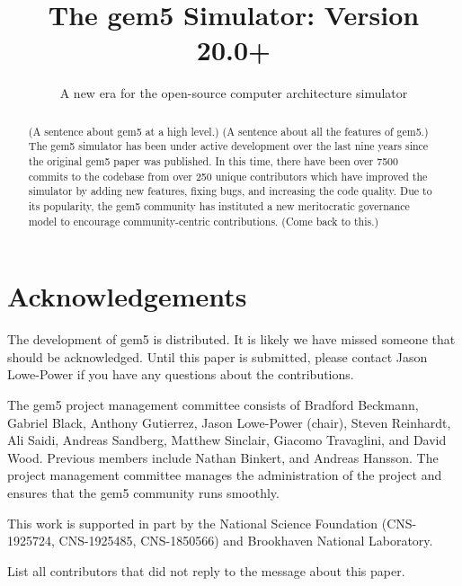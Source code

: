 \documentclass[manuscript, review, screen, timestamp]{acmart}
\begin{document}
\title{The gem5 Simulator: Version 20.0+}
\subtitle{A new era for the open-source computer architecture simulator}
%


\begin{abstract}
    (A sentence about gem5 at a high level.)
    (A sentence about all the features of gem5.)
    The gem5 simulator has been under active development over the last nine years since the original gem5 paper was published.
    In this time, there have been over 7500 commits to the codebase from over 250 unique contributors which have improved the simulator by adding new features, fixing bugs, and increasing the code quality.
    Due to its popularity, the gem5 community has instituted a new meritocratic governance model to encourage community-centric contributions.
    (Come back to this.)
\end{abstract}

\maketitle
\renewcommand{\shortauthors}{Lowe-Power and the gem5 Community}





\section{Acknowledgements}

The development of gem5 is distributed.
It is likely we have missed someone that should be acknowledged.
Until this paper is submitted, please contact Jason Lowe-Power if you have any questions about the contributions.

The gem5 project management committee consists of Bradford Beckmann, Gabriel Black, Anthony Gutierrez, Jason Lowe-Power (chair), Steven Reinhardt, Ali Saidi, Andreas Sandberg, Matthew Sinclair, Giacomo Travaglini, and David Wood.
Previous members include Nathan Binkert, and Andreas Hansson.
The project management committee manages the administration of the project and ensures that the gem5 community runs smoothly.

This work is supported in part by the National Science Foundation (CNS-1925724, CNS-1925485, CNS-1850566) and Brookhaven National Laboratory.

List all contributors that did not reply to the message about this paper.



\end{document}
